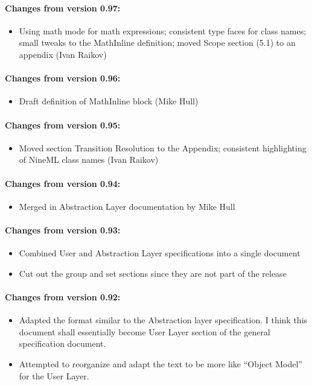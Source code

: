 \documentclass{article}
\begin{document}
\vskip 1in
\paragraph{Changes from version 0.97:}
\begin{itemize}
\item Using math mode for math expressions; consistent type faces for
  class names; small tweaks to the MathInline definition; moved Scope
  section (5.1) to an appendix (Ivan Raikov)
\end{itemize}

\paragraph{Changes from version 0.96:}
\begin{itemize}
\item Draft definition of MathInline block (Mike Hull)
\end{itemize}

\paragraph{Changes from version 0.95:}
\begin{itemize}
\item Moved section Transition Resolution to the Appendix; consistent
  highlighting of NineML class names (Ivan Raikov)
\end{itemize}

\paragraph{Changes from version 0.94:}
\begin{itemize}
\item Merged in Abstraction Layer documentation by Mike Hull
\end{itemize}

\paragraph{Changes from version 0.93:}
\begin{itemize}
\item Combined User and Abstraction Layer specifications into a single document
\item Cut out the group and set sections since they are not part of the release
\end{itemize}

\paragraph{Changes from version 0.92:}
\begin{itemize}
\item Adapted the format similar to the Abstraction layer specification.
I think this document shall essentially become User Layer section of the
general specification document.
\item Attempted to reorganize and adapt the text to be more like ``Object
Model'' for the User Layer.
\end{itemize}
\end{document}
